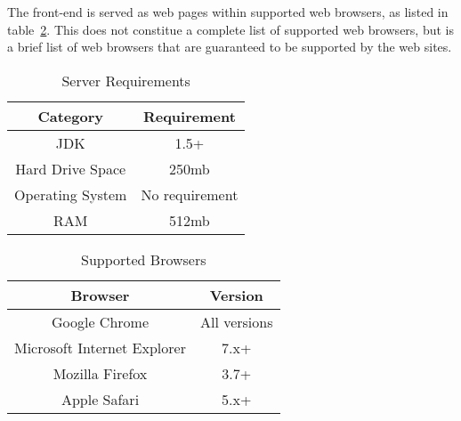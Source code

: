 \documentclass{article}
\begin{document}
The front-end is served as web pages within supported web browsers, as listed in
table~\ref{browsers}.  This does not constitue a complete list of supported web
browsers, but is a brief list of web browsers that are guaranteed to be supported
by the web sites.

\begin{table}
    \centering
    \begin{tabular}{|c|c|}\hline
        Category & Requirement \\\hline\hline
        JDK & 1.5+ \\\hline
        Hard Drive Space & 250mb \\\hline
        Operating System & No requirement \\\hline
        RAM & 512mb \\\hline
    \end{tabular}
    \caption{Server Requirements}
    \label{server}
\end{table}

\begin{table}
    \centering
    \begin{tabular}{|c|c|}\hline
        Browser & Version \\\hline\hline
        Google Chrome & All versions  \\\hline
        Microsoft Internet Explorer & 7.x+ \\\hline
        Mozilla Firefox & 3.7+ \\\hline
        Apple Safari & 5.x+ \\\hline
    \end{tabular}
    \caption{Supported Browsers}
    \label{browsers}
\end{table}
\end{document}
